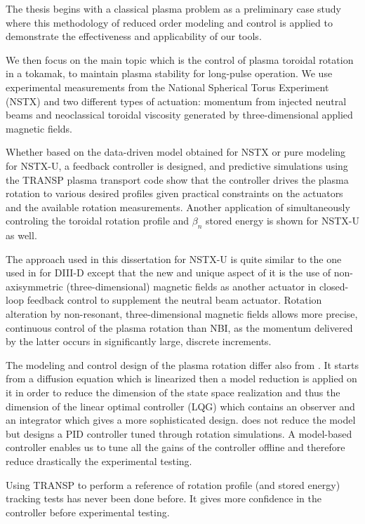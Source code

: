 \documentclass[12pt,lot, lof]{puthesis}
\begin{document}
The thesis begins with a classical plasma problem as a preliminary case study where this methodology of reduced order modeling and control is applied to demonstrate the effectiveness and applicability of our tools. 

We then focus on the main topic which is the control of plasma toroidal rotation in a tokamak, to maintain plasma stability for long-pulse operation. We use experimental measurements from the National Spherical Torus Experiment (NSTX) and two different types of actuation: momentum from injected neutral beams and neoclassical toroidal viscosity generated by three-dimensional applied magnetic fields. 

Whether based on the data-driven model obtained for NSTX or pure modeling for NSTX-U, a feedback controller is designed, and predictive simulations using the TRANSP plasma transport code show that the controller drives the plasma rotation to various desired profiles given practical constraints on the actuators and the available rotation measurements. Another application of simultaneously controling the toroidal rotation profile and $\beta_n$ stored energy is shown for NSTX-U as well. 

The approach used in this dissertation for NSTX-U is quite similar to the one used in \cite{Scoville07} for DIII-D  except that the new and unique aspect of it is the use of non-axisymmetric (three-dimensional) magnetic fields as another actuator in closed-loop feedback control to supplement the neutral beam actuator. Rotation alteration by non-resonant, three-dimensional magnetic fields allows more precise, continuous control of the plasma rotation than NBI, as the momentum delivered by the latter occurs in significantly large, discrete increments.

The modeling and control design of the plasma rotation differ also from \cite{Scoville07}. It starts from a diffusion equation which is linearized then a model reduction is applied on it in order to reduce the dimension of the state space realization and thus the dimension of the linear optimal controller (LQG) which contains an observer and an integrator which gives a more sophisticated design. \cite{Scoville07} does not reduce the model but designs a PID controller tuned through rotation simulations. A model-based controller enables us to tune all the gains of the controller offline and therefore reduce drastically the experimental testing.

Using TRANSP to perform a reference of rotation profile (and stored energy) tracking tests has never been done before. It gives more confidence in the controller before experimental testing.
\end{document}
